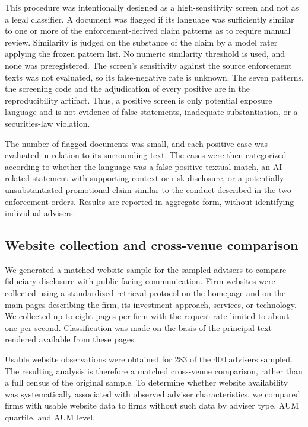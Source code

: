 \documentclass[utf8]{FrontiersinHarvard}
\begin{document}
This procedure was intentionally designed as a high-sensitivity screen and not as a legal classifier. A document was flagged if its language was sufficiently similar to one or more of the enforcement-derived claim patterns as to require manual review. Similarity is judged on the substance of the claim by a model rater applying the frozen pattern list. No numeric similarity threshold is used, and none was preregistered. The screen's sensitivity against the source enforcement texts was not evaluated, so its false-negative rate is unknown. The seven patterns, the screening code and the adjudication of every positive are in the reproducibility artifact. Thus, a positive screen is only potential exposure language and is not evidence of false statements, inadequate substantiation, or a securities-law violation.

The number of flagged documents was small, and each positive case was evaluated in relation to its surrounding text. The cases were then categorized according to whether the language was a false-positive textual match, an AI-related statement with supporting context or risk disclosure, or a potentially unsubstantiated promotional claim similar to the conduct described in the two enforcement orders. Results are reported in aggregate form, without identifying individual advisers.

\subsection{Website collection and cross-venue comparison}

We generated a matched website sample for the sampled advisers to compare fiduciary disclosure with public-facing communication. Firm websites were collected using a standardized retrieval protocol on the homepage and on the main pages describing the firm, its investment approach, services, or technology. We collected up to eight pages per firm with the request rate limited to about one per second. Classification was made on the basis of the principal text rendered available from these pages.

Usable website observations were obtained for 283 of the 400 advisers sampled. The resulting analysis is therefore a matched cross-venue comparison, rather than a full census of the original sample. To determine whether website availability was systematically associated with observed adviser characteristics, we compared firms with usable website data to firms without such data by adviser type, AUM quartile, and AUM level.
\end{document}
